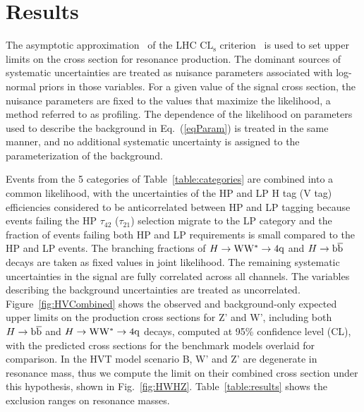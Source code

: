 \newpage
\section{Results}
\label{results}
The asymptotic approximation~\cite{AsymptCLs} of the LHC
$\mathrm{CL_s}$ criterion~\cite{CLs1,CLs3} is used to set upper limits on
the cross section for resonance production. The dominant sources of
systematic uncertainties are treated as nuisance parameters associated
with log-normal priors in those variables.
For a given value of the
signal cross section, the nuisance parameters are fixed to the values
that maximize the likelihood, a method referred to as
profiling. The dependence of the likelihood on parameters used to
describe the background in Eq.~(\ref{eqParam}) is treated in the same
manner, and no additional systematic uncertainty is assigned
to the parameterization of the background.


Events from the 5 categories of Table~\ref{table:categories} 
are combined into a  
common likelihood, with the uncertainties of the HP and LP H tag (V tag)
efficiencies considered to be anticorrelated between HP
and LP tagging because events failing the 
HP $\tau_{42}$ ($\tau_{21}$) selection migrate to the LP category
and the fraction of events failing both HP and LP requirements is
small compared to the HP and LP events.
The branching fractions of $H \to {\rm W}{\rm W}^*\to4{\rm q}$ and $H \to \mathrm{b\overline{b}}$ decays
are taken as  fixed values in joint likelihood.
The remaining systematic uncertainties in the signal
are fully correlated across all channels.  The variables
describing the background uncertainties are treated as uncorrelated.
Figure~\ref{fig:HVCombined} shows 
  the observed and background-only expected upper limits
 on the production cross sections for
Z' and W', including both $H \to \mathrm{b\overline{b}}$ and $H \to {\rm W}{\rm W}^*\to4{\rm q}$ decays,
computed at 95\% confidence level (CL), with the predicted
cross sections for the benchmark models overlaid for
comparison. 
In the HVT model scenario B, 
W' and Z' are degenerate in resonance mass, 
thus we compute the limit on their combined cross section under this hypothesis, shown in Fig.~\ref{fig:HWHZ}.
Table~\ref{table:results} shows the
exclusion ranges on resonance masses.


